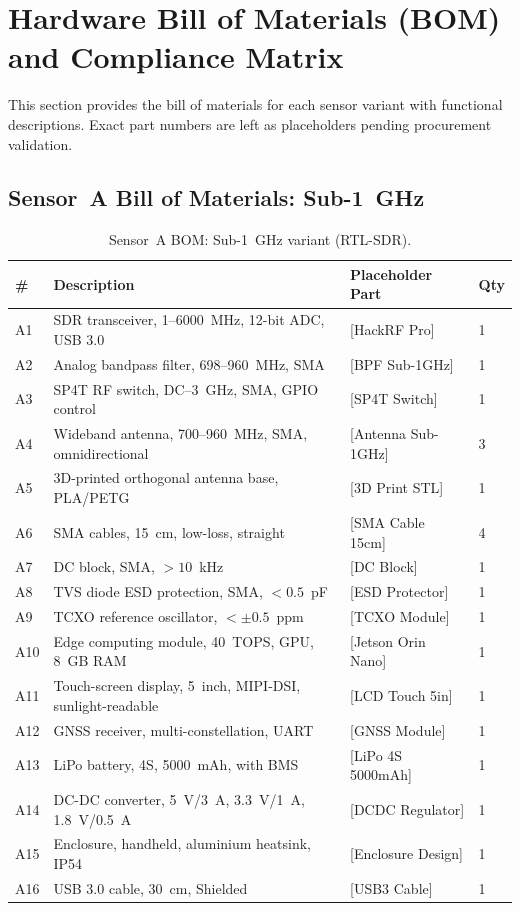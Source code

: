 \documentclass[11pt,a4paper]{article}
\begin{document}
\section{Hardware Bill of Materials (BOM) and Compliance Matrix}
\label{sec:bom_matrix}

This section provides the bill of materials for each sensor variant with functional descriptions. Exact part numbers are left as placeholders pending procurement validation.

\subsection{Sensor~A Bill of Materials: Sub-1~GHz}

\begin{table}[ht]
\centering
\caption{Sensor~A BOM: Sub-1~GHz variant (RTL-SDR).}
\label{tab:bom_sensorA}
\small
\begin{tabular}{L{1.0cm} L{5.0cm} L{4.0cm} C{2.0cm}}
\toprule
\textbf{\#} & \textbf{Description} & \textbf{Placeholder Part} & \textbf{Qty} \\
\midrule
A1 & SDR transceiver, 1--6000~MHz, 12-bit ADC, USB 3.0 & [HackRF Pro] & 1 \\
A2 & Analog bandpass filter, 698--960~MHz, SMA & [BPF Sub-1GHz] & 1 \\
A3 & SP4T RF switch, DC--3~GHz, SMA, GPIO control & [SP4T Switch] & 1 \\
A4 & Wideband antenna, 700--960~MHz, SMA, omnidirectional & [Antenna Sub-1GHz] & 3 \\
A5 & 3D-printed orthogonal antenna base, PLA/PETG & [3D Print STL] & 1 \\
A6 & SMA cables, 15~cm, low-loss, straight & [SMA Cable 15cm] & 4 \\
A7 & DC block, SMA, $> 10$~kHz & [DC Block] & 1 \\
A8 & TVS diode ESD protection, SMA, $< 0.5$~pF & [ESD Protector] & 1 \\
A9 & TCXO reference oscillator, $< \pm 0.5$~ppm & [TCXO Module] & 1 \\
A10 & Edge computing module, 40~TOPS, GPU, 8~GB RAM & [Jetson Orin Nano] & 1 \\
A11 & Touch-screen display, 5~inch, MIPI-DSI, sunlight-readable & [LCD Touch 5in] & 1 \\
A12 & GNSS receiver, multi-constellation, UART & [GNSS Module] & 1 \\
A13 & LiPo battery, 4S, 5000~mAh, with BMS & [LiPo 4S 5000mAh] & 1 \\
A14 & DC-DC converter, 5~V/3~A, 3.3~V/1~A, 1.8~V/0.5~A & [DCDC Regulator] & 1 \\
A15 & Enclosure, handheld, aluminium heatsink, IP54 & [Enclosure Design] & 1 \\
A16 & USB 3.0 cable, 30~cm, Shielded & [USB3 Cable] & 1 \\
\bottomrule
\end{tabular}
\end{table}
\end{document}
